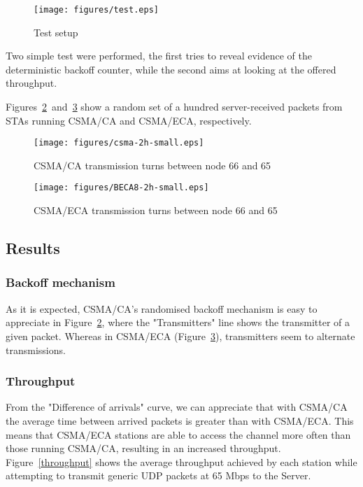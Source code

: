 \documentclass[conference]{IEEEtran}
\begin{document}
\begin{figure}[htbp]
\centering
  \texttt{[image: figures/test.eps]}
  \caption{Test setup}
  \label{setup}
\end{figure}

Two simple test were performed, the first tries to reveal evidence of the deterministic backoff counter, while the second aims at looking at the offered throughput. 

Figures~\ref{ca-backoff}~and~\ref{eca-backoff} show a random set of a hundred server-received packets from STAs running CSMA/CA and CSMA/ECA, respectively.

\begin{figure}[htbp]
\centering
  \texttt{[image: figures/csma-2h-small.eps]}
  \caption{CSMA/CA transmission turns between node 66 and 65}
  \label{ca-backoff}
\end{figure}

\begin{figure}[htbp]
\centering
  \texttt{[image: figures/BECA8-2h-small.eps]}
  \caption{CSMA/ECA transmission turns between node 66 and 65}
  \label{eca-backoff}
\end{figure}

\subsection{Results}

\subsubsection*{Backoff mechanism}
As it is expected, CSMA/CA's randomised backoff mechanism is easy to appreciate in Figure~\ref{ca-backoff}, where the "Transmitters" line shows the transmitter of a given packet. Whereas in CSMA/ECA (Figure~\ref{eca-backoff}), transmitters seem to alternate transmissions.

\subsubsection*{Throughput}
From the "Difference of arrivals" curve, we can appreciate that with CSMA/CA the average time between arrived packets is greater than with CSMA/ECA. This means that CSMA/ECA stations are able to access the channel more often than those running CSMA/CA, resulting in an increased throughput. Figure~\ref{throughput} shows the average throughput achieved by each station while attempting to transmit generic UDP packets at 65 Mbps to the Server.
\end{document}
